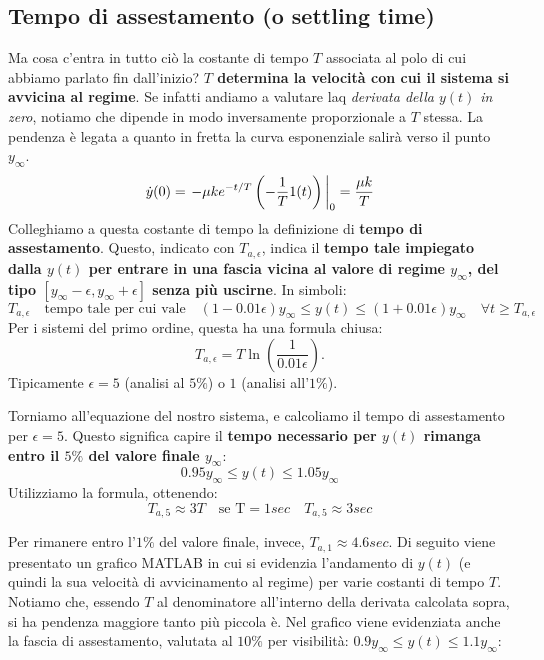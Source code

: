 \subsection{Tempo di assestamento (o settling time)}
\begin{defin}{}{}

Ma cosa c'entra in tutto ciò la costante di tempo $T$ associata al polo di cui abbiamo parlato fin dall'inizio? \textbf{$T$ determina la velocità con cui il sistema si avvicina al regime}. Se infatti andiamo a valutare laq \textit{derivata della $y(t)$ in zero}, notiamo che dipende in modo inversamente proporzionale a $T$ stessa. La pendenza è legata a quanto in fretta la curva esponenziale salirà verso il punto $y_\infty$.
\begin{equation*}
\dot y(0) = \eval{-\mu ke^{-t/T}\paren{-\frac{1}{T} 1(t)}}_{0} = \frac{\mu k}{T}
\end{equation*}
Colleghiamo a questa costante di tempo la definizione di \textbf{tempo di assestamento}. Questo, indicato con $T_{a, \epsilon}$, indica il \textbf{tempo tale impiegato dalla $y(t)$ per entrare in una fascia vicina al valore di regime $y_\infty$, del tipo $[y_\infty - \epsilon, y_\infty + \epsilon]$ senza più uscirne}. In simboli:
\begin{equation}
T_{a,\epsilon} \quad \textrm{tempo tale per cui vale} \quad (1-0.01\epsilon)y_\infty \leq y(t) \leq (1+0.01\epsilon)y_\infty \quad \forall t \geq T_{a,\epsilon}
\end{equation}
Per i sistemi del primo ordine, questa ha una formula chiusa:
\begin{equation}
T_{a,\epsilon} = T \ln(\frac{1}{0.01\epsilon}).
\end{equation}
Tipicamente $\epsilon = 5$ (analisi al $5\%$) o $1$ (analisi all'$1\%$).
\end{defin}

Torniamo all'equazione del nostro sistema, e calcoliamo il tempo di assestamento per $\epsilon = 5$. Questo significa capire il \textbf{tempo necessario per $y(t)$ rimanga entro il $5\%$ del valore finale $y_\infty$}:
\begin{equation*}
0.95y_\infty \leq y(t) \leq 1.05 y_\infty
\end{equation*}
Utilizziamo la formula, ottenendo:
\begin{equation*}
T_{a, 5} \approx 3T \quad \textrm{se T} = 1sec  \quad T_{a,5} \approx 3sec
\end{equation*}

Per rimanere entro l'$1\%$ del valore finale, invece, \rarr $T_{a,1} \approx 4.6sec $. Di seguito viene presentato un grafico  MATLAB in cui si evidenzia l'andamento di $y(t)$ (e quindi la sua velocità di avvicinamento al regime) per varie costanti di tempo $T$. Notiamo che, essendo $T$ al denominatore all'interno della derivata calcolata sopra, si ha pendenza maggiore tanto più piccola è. Nel grafico viene evidenziata anche la fascia di assestamento, valutata al $10\%$ per visibilità: $0.9 y_\infty \leq y(t) \leq 1.1y_\infty$: 

